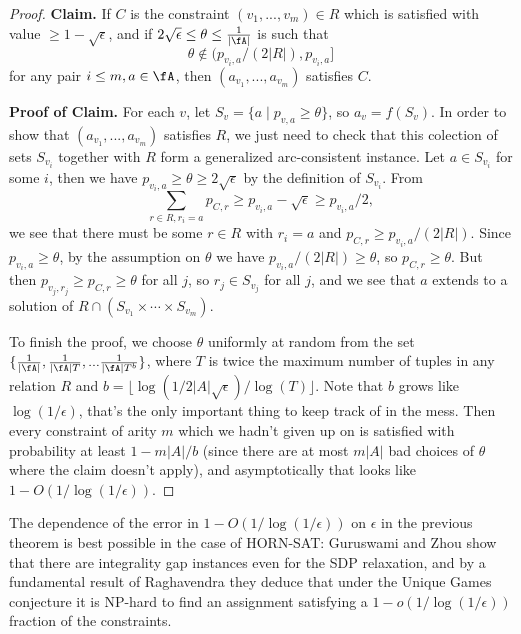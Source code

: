 \begin{proof}
{\bf Claim.} If $C$ is the constraint $(v_1, ..., v_m) \in R$ which is satisfied with value $\ge 1 - \sqrt{\epsilon}$, and if $2\sqrt{\epsilon} \le \theta \le \frac{1}{|\fA|}$ is such that
\[
\theta \not\in (p_{v_i,a}/(2|R|), p_{v_i,a}]
\]
for any pair $i \le m, a \in \fA$, then $(a_{v_1}, ..., a_{v_m})$ satisfies $C$.

{\bf Proof of Claim.} For each $v$, let $S_v = \{a \mid p_{v,a} \ge \theta\}$, so $a_v = f(S_v)$. In order to show that $(a_{v_1}, ..., a_{v_m})$ satisfies $R$, we just need to check that this colection of sets $S_{v_i}$ together with $R$ form a generalized arc-consistent instance. Let $a \in S_{v_i}$ for some $i$, then we have $p_{v_i,a} \ge \theta \ge 2\sqrt{\epsilon}$ by the definition of $S_{v_i}$. From
\[
\sum_{r \in R, r_i = a} p_{C,r} \ge p_{v_i,a} - \sqrt{\epsilon} \ge p_{v_i,a}/2,
\]
we see that there must be some $r \in R$ with $r_i = a$ and $p_{C,r} \ge p_{v_i,a}/(2|R|)$. Since $p_{v_i,a} \ge \theta$, by the assumption on $\theta$ we have $p_{v_i,a}/(2|R|) \ge \theta$, so $p_{C,r} \ge \theta$. But then $p_{v_j,r_j} \ge p_{C,r} \ge \theta$ for all $j$, so $r_j \in S_{v_j}$ for all $j$, and we see that $a$ extends to a solution of $R \cap (S_{v_1} \times \cdots \times S_{v_m})$.

To finish the proof, we choose $\theta$ uniformly at random from the set $\{\frac{1}{|\fA|}, \frac{1}{|\fA|T}, ... \frac{1}{|\fA|T^b}\}$, where $T$ is twice the maximum number of tuples in any relation $R$ and $b = \lfloor \log(1/2|A|\sqrt{\epsilon})/\log(T) \rfloor$. Note that $b$ grows like $\log(1/\epsilon)$, that's the only important thing to keep track of in the mess. Then every constraint of arity $m$ which we hadn't given up on is satisfied with probability at least $1 - m|A|/b$ (since there are at most $m|A|$ bad choices of $\theta$ where the claim doesn't apply), and asymptotically that looks like $1 - O(1/\log(1/\epsilon))$.
\end{proof}

\begin{rem} The dependence of the error in $1 - O(1/\log(1/\epsilon))$ on $\epsilon$ in the previous theorem is best possible in the case of HORN-SAT: Guruswami and Zhou \cite{robust-horn-gap} show that there are integrality gap instances even for the SDP relaxation, and by a fundamental result of Raghavendra \cite{raghavendra-optimal} they deduce that under the Unique Games conjecture it is NP-hard to find an assignment satisfying a $1-o(1/\log(1/\epsilon))$ fraction of the constraints.
\end{rem}

